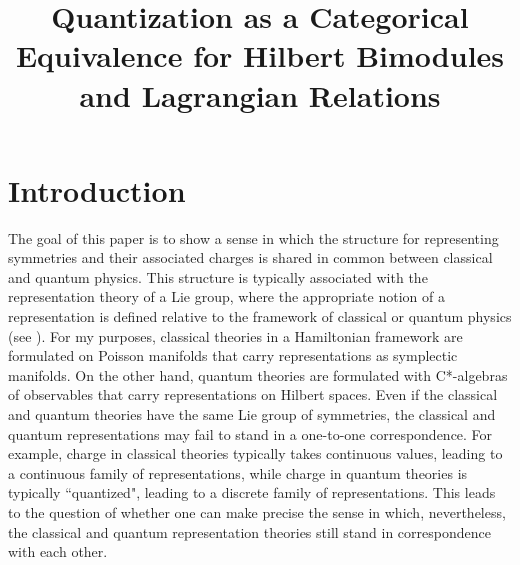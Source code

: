 \documentclass[sn-mathphys,Numbered]{sn-jnl}
\title{Quantization as a Categorical Equivalence for Hilbert Bimodules and Lagrangian Relations}
\author{\fnm{Benjamin H.} \sur{~Feintzeig}}\email{bfeintze@uw.edu}
\affil{\centering{\orgdiv{Department of Philosophy}, \orgname{University of Washington},\\ \orgaddress{\city{Seattle}, \state{WA}, \country{USA}, \postcode{98195-3350}}}}
\begin{document}
\maketitle


\section{Introduction}

The goal of this paper is to show a sense in which the structure for representing symmetries and their associated charges is shared in common between classical and quantum physics.  This structure is typically associated with the representation theory of a Lie group, where the appropriate notion of a representation is defined relative to the framework of classical or quantum physics (see \citep{Ma68,MaWe74}).  For my purposes, classical theories in a Hamiltonian framework are formulated on Poisson manifolds that carry representations as symplectic manifolds.  On the other hand, quantum theories are formulated with C*-algebras of observables that carry representations on Hilbert spaces.  Even if the classical and quantum theories have the same Lie group of symmetries, the classical and quantum representations may fail to stand in a one-to-one correspondence.  For example, charge in classical theories typically takes continuous values, leading to a continuous family of representations, while charge in quantum theories is typically ``quantized", leading to a discrete family of representations.  This leads to the question of whether one can make precise the sense in which, nevertheless, the classical and quantum representation theories still stand in correspondence with each other.
\end{document}
